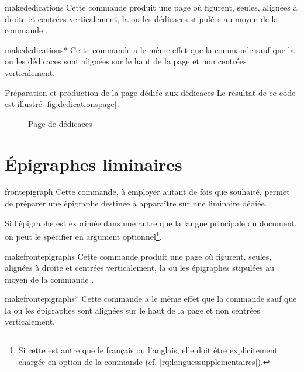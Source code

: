 \begin{docCommand}{makededications}{}
  Cette commande produit une page où figurent, seules, alignées à droite et
  centrées verticalement, la ou les dédicaces stipulées au moyen de la commande
  .
\end{docCommand}
%
\begin{docCommand}{makededications*}{}
  Cette commande a le même effet que la commande  sauf
  que la ou les dédicaces sont alignées sur le haut de la page et non centrées
  verticalement.
\end{docCommand}

\begin{dbexample}{Préparation et production de la page dédiée aux dédicaces}{}
  \NoAutoSpacing%
%
  Le résultat de ce code est illustré \vref{fig:dedicationspage}.
\end{dbexample}

\begin{figure}[htbp]
  \centering {}%
  \caption{Page de dédicaces}
  \label{fig:dedicationspage}
\end{figure}

\section{Épigraphes liminaires}

\begin{docCommand}{frontepigraph}{}
  Cette commande, à employer autant de fois que
  souhaité\hauteurpage{}, permet de préparer une épigraphe destinée à
  apparaître sur une \gls{liminaire} dédiée.

  Si l'épigraphe est exprimée dans une   autre que la langue principale du document, on peut le
  spécifier en argument optionnel\footnote{Si cette  est autre que
    le français ou l'anglais, elle doit être explicitement chargée en option de
    la commande  (cf.
    \vref{rq:languessupplementaires}).}.
\end{docCommand}

\begin{docCommand}{makefrontepigraphs}{}
  Cette commande produit une page où figurent, seules, alignées à droite et
  centrées verticalement, la ou les épigraphes stipulées au moyen de la
  commande .
\end{docCommand}
%
\begin{docCommand}{makefrontepigraphs*}{}
  Cette commande a le même effet que la commande 
  sauf que la ou les épigraphes sont alignées sur le haut de la page et non
  centrées verticalement.
\end{docCommand}

